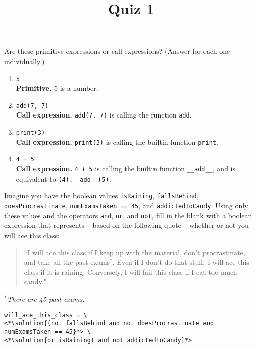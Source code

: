 \documentclass[twoside]{article}
\title{\sc Quiz 1 \solution{Solutions}}
\newcommand{\solution}[1]{{\color{red}#1}}
\begin{document}
\maketitle

\begin{enumerate}

Are these primitive expressions or call expressions? (Answer for each one individually.)
\begin{enumerate}
\item \texttt{5} \\
\solution{\textbf{Primitive.} 5 is a number.}
\item \texttt{add(7, 7)} \\
\solution{\textbf{Call expression.} \texttt{add(7, 7)} is calling the function \texttt{add}.} 
\item \texttt{print(3)} \\
\solution{\textbf{Call expression.} \texttt{print(3)} is calling the builtin function \texttt{print}.}
\item \texttt{4 + 5} \\
\solution{\textbf{Call expression.} \texttt{4 + 5} is calling the builtin function \texttt{\_\_add\_\_}, and is equivalent to \texttt{(4).\_\_add\_\_(5).}}
\end{enumerate}


Imagine you have the boolean values \texttt{isRaining}, \texttt{fallsBehind}, \texttt{doesProcrastinate}, \texttt{numExamsTaken == 45}, and \texttt{addictedToCandy}. Using only these values and the operators \texttt{and}, \texttt{or}, and \texttt{not}, fill in the blank with a boolean expression that represents -- based on the following quote -- whether or not you will ace this class:

\begin{quote}
``I will ace this class if I keep up with the material, don't procrastinate, and take all the past exams$^*$. Even if I don't do that stuff, I will ace this class if it is raining. Conversely, I will fail this class if I eat too much candy."
\end{quote}

\hfill $^*$\textit{There are 45 past exams.}

\begin{lstlisting}
will_ace_this_class = \
<*\solution{(not fallsBehind and not doesProcrastinate and numExamsTaken == 45}*> \
<*\solution{or isRaining) and not addictedToCandy}*>
\end{lstlisting}


\end{enumerate}
\end{document}

